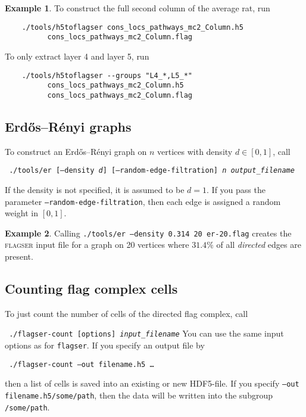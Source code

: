 \documentclass{amsart}
\theoremstyle{definition}
\newtheorem*{example*}{Example}
\begin{document}
\begin{example*}
  To construct the full second column of the average rat, run

  \begin{verbatim}
    ./tools/h5toflagser cons_locs_pathways_mc2_Column.h5
          cons_locs_pathways_mc2_Column.flag
  \end{verbatim}

  To only extract layer 4 and layer 5, run

  \begin{verbatim}
    ./tools/h5toflagser --groups "L4_*,L5_*"
          cons_locs_pathways_mc2_Column.h5
          cons_locs_pathways_mc2_Column.flag
  \end{verbatim}
\end{example*}

\subsection{Erdős–Rényi graphs}
To construct an Erdős–Rényi graph on $n$ vertices with density $d\in[0,1]$, call

\noindent
\verb| |\qquad\texttt{./tools/er
[--density \textit{d}] [--random-edge-filtration] \textit{n} \textit{output\_filename}}

\noindent
If the density is not specified, it is assumed to be $d=1$.
If you pass the parameter \texttt{--random-edge-filtration}, then each edge is assigned a random
weight in $[0,1]$.

\begin{example*}
  Calling \texttt{./tools/er --density 0.314 20 er-20.flag} creates the \textsc{flagser} input file
  for a graph on 20 vertices where $31.4\%$ of all \emph{directed} edges are present.
\end{example*}

\subsection{Counting flag complex cells}
To just count the number of cells of the directed flag complex, call

\noindent
\verb| |\qquad\texttt{./flagser-count [options] \textit{input\_filename}}
You can use the same input options as for \texttt{flagser}. If you specify an output file by

\noindent
\verb| |\qquad\texttt{./flagser-count --out filename.h5 \ldots}

\noindent
then a list of cells is saved into an existing or new HDF5-file. If you specify \texttt{--out
filename.h5/some/path}, then the data will be written into the subgroup \texttt{/some/path}.
\end{document}
